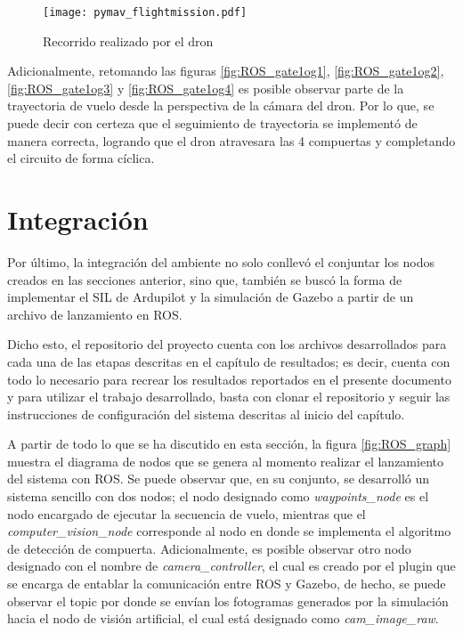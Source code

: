 \begin{figure}[ht]
    \centering
    \texttt{[image: pymav\_flightmission.pdf]}
    \caption{Recorrido realizado por el dron}
    \label{fig:pymav_flightmission}
\end{figure}

Adicionalmente, retomando las figuras \ref{fig:ROS_gate1og1}, \ref{fig:ROS_gate1og2}, \ref{fig:ROS_gate1og3} y \ref{fig:ROS_gate1og4} es posible observar parte de la trayectoria de vuelo desde la perspectiva de la cámara del dron. Por lo que, se puede decir con certeza que el seguimiento de trayectoria se implementó de manera correcta, logrando que el dron atravesara las 4 compuertas y completando el circuito de forma cíclica.

\section{Integración}
Por último, la integración del ambiente no solo conllevó el conjuntar los nodos creados en las secciones anterior, sino que, también se buscó la forma de implementar el SIL de Ardupilot y la simulación de Gazebo a partir de un archivo de lanzamiento en ROS. 

Dicho esto, el repositorio del proyecto cuenta con los archivos desarrollados para cada una de las etapas descritas en el capítulo de resultados; es decir, cuenta con todo lo necesario para recrear los resultados reportados en el presente documento y para utilizar el trabajo desarrollado, basta con clonar el repositorio y seguir las instrucciones de configuración del sistema descritas al inicio del capítulo.

A partir de todo lo que se ha discutido en esta sección, la figura \ref{fig:ROS_graph} muestra el diagrama de nodos que se genera al momento realizar el lanzamiento del sistema con ROS. Se puede observar que, en su conjunto, se desarrolló un sistema sencillo con dos nodos; el nodo designado como \textit{waypoints\_node} es el nodo encargado de ejecutar la secuencia de vuelo, mientras que el \textit{computer\_vision\_node} corresponde al nodo en donde se implementa el algoritmo de detección de compuerta. Adicionalmente, es posible observar otro nodo designado con el nombre de \textit{camera\_controller}, el cual es creado por el plugin que se encarga de entablar la comunicación entre ROS y Gazebo, de hecho, se puede observar el topic por donde se envían los fotogramas generados por la simulación hacia el nodo de visión artificial, el cual está designado como \textit{cam\_image\_raw}.

